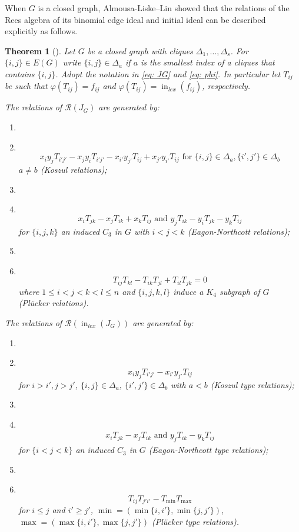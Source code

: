 \documentclass[reqno]{amsart}
\newcommand\Item[1][]{
  \ifx\relax#1\relax  \item \else \item[#1] \fi
  \abovedisplayskip=1pt
  \abovedisplayshortskip=1pt~\vspace*{-\baselineskip}}
\newtheorem{thm}{Theorem}[section]
\theoremstyle{definition}
\theoremstyle{remark}
\numberwithin{equation}{section}
\DeclareMathOperator{\init}{in}
\begin{document}
When $G$ is a closed graph, Almousa-Liske–Lin showed that the relations of the Rees algebra of its binomial edge ideal and initial ideal can be described explicitly as follows.

\begin{thm}[{\cite[Theorem 4.5]{ALL}}]\label{thm: rees}
    Let $G$ be a closed graph with cliques $\Delta_1, \ldots, \Delta_s$. For $\{i,j\}\in E(G)$ write $\{i,j\}\in \Delta_a$ if $a$ is the smallest index of a cliques that contains $\{i,j\}$. Adopt the notation in \eqref{eq: JG} and \eqref{eq: phi}. In particular let $T_{ij}$ be such that $\varphi(T_{ij})=f_{ij}$ and $\varphi(T_{ij})=\init_{lex}(f_{ij})$, respectively.
    
     The relations of $\mathcal{R}(J_G)$ are generated by:
    \begin{enumerate}
        \Item \label{K}
        \[
            {x_iy_jT_{i'j'}} - x_jy_iT_{i'j'} -x_{i'}y_{j'}T_{ij} + x_{j'}y_{i'}T_{ij} \text{ for }  \{i,j\}\in\Delta_a, \{i',j'\}\in \Delta_b \]
             $a\neq b $  (Koszul relations);
        \Item  \begin{equation}
           {x_iT_{jk}}-x_jT_{ik}+x_kT_{ij}  \text{ and } {y_jT_{ik} }-y_iT_{jk}-y_kT_{ij} \label{EN-rels}
        \end{equation} for $\{i,j,k\}$  an induced $C_3$ in $G$ with $i<j<k$ (Eagon-Northcott relations);
        \Item \[
            {T_{ij}T_{kl}} -T_{ik}T_{jl} + T_{il}T_{jk} = 0
       \] where $1\leq i<j<k<l\leq n$ and $\{i, j, k, l\}$  induce a $K_4$ subgraph of $G$ 
      (Pl\"ucker relations).
    \end{enumerate}
    
    The relations of $\mathcal{R}(\init_{lex}(J_G))$ are generated by:
    \begin{enumerate}
        \Item 
        \[
            {x_iy_jT_{i'j'}}-x_{i'}y_{j'}T_{ij}
       \]
        for $i>i', j>j'$, $\{i,j\}\in\Delta_a$, $\{i',j'\}\in \Delta_b$ with $a<b$  {\em (Koszul type relations)};

        \Item  \begin{eqnarray}
            {x_iT_{jk}}-x_jT_{ik}   \text{ and } {y_jT_{ik}}-y_kT_{ij} \label{EN-type}
        \end{eqnarray} for $\{i<j<k\}$  an induced $C_3$ in $G$ {\em (Eagon-Northcott type relations)};
 
        \Item \[
            {T_{ij}T_{j'i'}}-T_{\min}T_{\max}
       \] for $i\leq j$ and $i'\geq j'$, $\min=(\min\{i,i'\}, \min\{j,j'\})$, $\max=(\max\{i,i'\}, \max\{j,j'\})$  
        {\em (Pl\"ucker type relations)}.
    \end{enumerate}
\end{thm}
\end{document}
